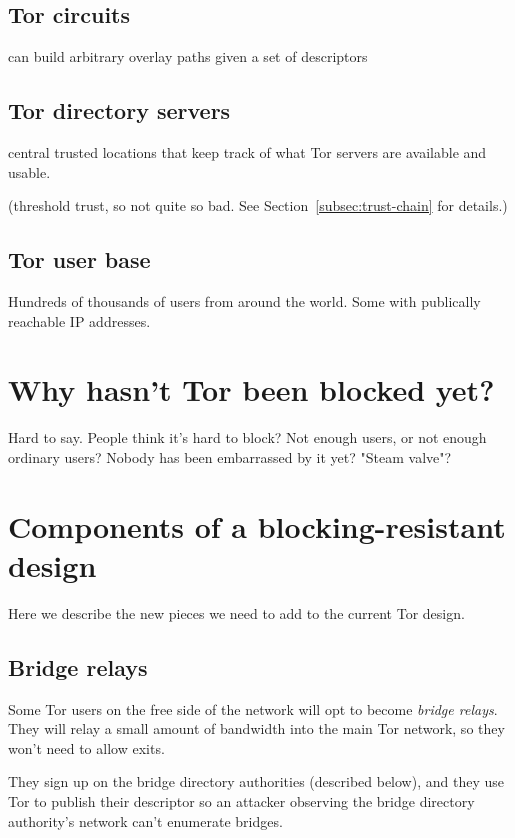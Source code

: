 \documentclass{llncs}
\begin{document}
\subsection{Tor circuits}

can build arbitrary overlay paths given a set of descriptors~\cite{blossom}

\subsection{Tor directory servers}

central trusted locations that keep track of what Tor servers are
available and usable.

(threshold trust, so not quite so bad. See
Section~\ref{subsec:trust-chain} for details.)

\subsection{Tor user base}

Hundreds of thousands of users from around the world. Some with publically
reachable IP addresses.

\section{Why hasn't Tor been blocked yet?}

Hard to say. People think it's hard to block? Not enough users, or not
enough ordinary users? Nobody has been embarrassed by it yet? "Steam
valve"?




\section{Components of a blocking-resistant design}

Here we describe the new pieces we need to add to the current Tor design.

\subsection{Bridge relays}

Some Tor users on the free side of the network will opt to become
\emph{bridge relays}. They will relay a small amount of bandwidth into
the main Tor network, so they won't need to allow exits.

They sign up on the bridge directory authorities (described below),
and they use Tor to publish their descriptor so an attacker observing
the bridge directory authority's network can't enumerate bridges.
\end{document}
